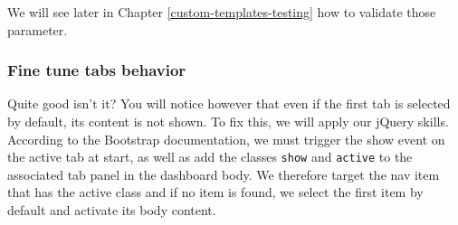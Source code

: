 \documentclass[
]{book}
\newenvironment{Shaded}{\begin{snugshade}}{\end{snugshade}}
\newcommand{\AttributeTok}[1]{\textcolor[rgb]{0.77,0.63,0.00}{#1}}
\newcommand{\CommentTok}[1]{\textcolor[rgb]{0.56,0.35,0.01}{\textit{#1}}}
\newcommand{\ControlFlowTok}[1]{\textcolor[rgb]{0.13,0.29,0.53}{\textbf{#1}}}
\newcommand{\DecValTok}[1]{\textcolor[rgb]{0.00,0.00,0.81}{#1}}
\newcommand{\KeywordTok}[1]{\textcolor[rgb]{0.13,0.29,0.53}{\textbf{#1}}}
\newcommand{\NormalTok}[1]{#1}
\newcommand{\OperatorTok}[1]{\textcolor[rgb]{0.81,0.36,0.00}{\textbf{#1}}}
\newcommand{\SpecialCharTok}[1]{\textcolor[rgb]{0.00,0.00,0.00}{#1}}
\newcommand{\StringTok}[1]{\textcolor[rgb]{0.31,0.60,0.02}{#1}}
\newcommand{\VariableTok}[1]{\textcolor[rgb]{0.00,0.00,0.00}{#1}}
\newcommand{\VerbatimStringTok}[1]{\textcolor[rgb]{0.31,0.60,0.02}{#1}}
\begin{document}
We will see later in Chapter \ref{custom-templates-testing} how to validate those parameter.

\hypertarget{fine-tune-tabs-behavior}{%
\subsubsection{Fine tune tabs behavior}\label{fine-tune-tabs-behavior}}

Quite good isn't it? You will notice however that even if the first tab is selected by default, its content is not shown. To fix this, we will apply our jQuery skills. According to the Bootstrap documentation, we must trigger the show event on the active tab at start, as well as add the classes \texttt{show} and \texttt{active} to the associated tab panel in the dashboard body. We therefore target the nav item that has the active class and if no item is found, we select the first item by default and activate its body content.

\begin{Shaded}
\end{Shaded}
\end{document}
